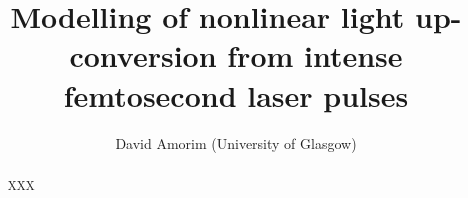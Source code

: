 \documentclass[a4paper]{jpconf}
\begin{document}

\title{Modelling of nonlinear light up-conversion from intense femtosecond laser pulses}
\author{David Amorim (University of Glasgow)}
\address{DESY Summer Student Programme 2023 \\ Group:  Attosecond Science (CFEL-ATTO) \\ Institute: Centre for Free-Electron Laser Science (CFEL)\\ Supervisor: Josina Hahne}

\thispagestyle{plain}
\pagestyle{plain}
\setlength{\footskip}{5pt}

\begin{abstract}
XXX
\end{abstract}
\end{document}
